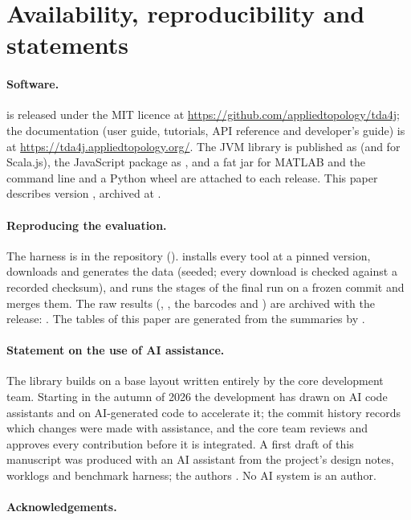 \section{Availability, reproducibility and statements}\label{sec:availability}

\paragraph{Software.}
\tdaj{} is released under the MIT licence at \url{https://github.com/appliedtopology/tda4j}; the documentation (user guide,
tutorials, API reference and developer's guide) is at \url{https://tda4j.appliedtopology.org/}. The JVM library is published as
 (and  for Scala.js), the JavaScript package as ,
and a fat jar for MATLAB and the command line and a Python wheel are attached to each release. This paper describes
version , archived at . 

\paragraph{Reproducing the evaluation.}
The harness is in the repository ().  installs every tool at a pinned version,
 downloads and generates the data (seeded; every download is checked against a recorded checksum), and
 runs the stages of the final run on a frozen commit and merges them. The raw results (,
, the barcodes and ) are archived with the release: . The tables of
this paper are generated from the summaries by .

\paragraph{Statement on the use of AI assistance.}
The library builds on a base layout written entirely by the core development team. Starting in the autumn of 2026 the
development has drawn on AI code assistants and on AI-generated code to accelerate it; the commit history records which
changes were made with assistance, and the core team reviews and approves every contribution before it is integrated. A first
draft of this manuscript was produced with an AI assistant from the project's design notes, worklogs and benchmark harness;
the authors . No AI system is an author.

\paragraph{Acknowledgements.}
